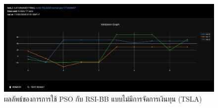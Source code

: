 \begin{figure}[ht]
    \centering
    \includegraphics[width=\textwidth]{images/pso/rsi-bb/tsla-normal.png}
    \caption{ผลลัพธ์ของการการใช้ PSO กับ RSI-BB แบบไม่มีการจัดการเงินทุน (TSLA)}
\end{figure}

